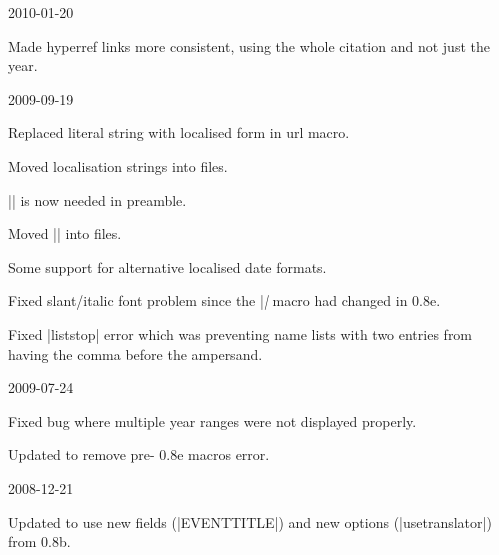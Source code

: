 \documentclass{ltxdockit}
\begin{document}
\begin{changelog}
\begin{release}{0.7}{2010-01-20}
\item Made hyperref links more consistent, using the whole citation and not
  just the year.
\end{release}


\begin{release}{0.5}{2009-09-19}
\item Replaced literal string with localised form in url macro.
\item Moved localisation strings into  files.
\item |\DeclareLanguageMapping| is now needed in preamble.
\item Moved |\DeclareBibliographyExtras| into  files.
\item Some support for alternative localised date formats.
\item Fixed slant/italic font problem since the |\mkbibemph| macro had
  changed in  0.8e.
\item Fixed |liststop| error which was preventing name lists with two
  entries from having the comma before the ampersand.
\end{release}

\begin{release}{0.4}{2009-07-24}
\item Fixed bug where multiple year ranges were not displayed properly.
\item Updated to remove pre- 0.8e macros error.
\end{release}

\begin{release}{0.3}{2008-12-21}
\item Updated to use new fields (|EVENTTITLE|) and new options
  (|usetranslator|) from  0.8b.
\end{release}


\end{changelog}
\end{document}
